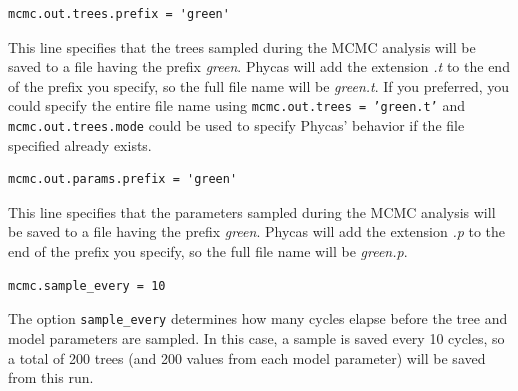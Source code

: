 \documentclass[10pt]{article}
\newcommand{\pathname}[1]{{\em #1}}				%
\newcommand{\code}[1]{{\tt #1}}					%
\newcommand{\opt}[1]{{\tt \small #1}\index{#1}}	%
\begin{document}
\begin{samepage}
\begin{verbatim}
mcmc.out.trees.prefix = 'green'
\end{verbatim}
This line specifies that the trees sampled during the MCMC analysis will be saved to a file having the prefix \pathname{green}. Phycas will add the extension \pathname{.t} to the end of the prefix you specify, so the full file name will be \pathname{green.t}. If you preferred, you could specify the entire file name using \code{mcmc.out.trees = 'green.t'} and \code{mcmc.out.trees.mode} could be used to specify Phycas' behavior if the file specified already exists.
\end{samepage}

\begin{samepage}
\begin{verbatim}
mcmc.out.params.prefix = 'green'
\end{verbatim}
This line specifies that the parameters sampled during the MCMC analysis will be saved to a file having the prefix \pathname{green}. Phycas will add the extension \pathname{.p} to the end of the prefix you specify, so the full file name will be \pathname{green.p}. 
\end{samepage}


\begin{samepage}
\begin{verbatim}
mcmc.sample_every = 10
\end{verbatim}
The option \opt{sample\_every} determines how many cycles elapse before the tree and model parameters are sampled. In this case, a sample is saved every 10 cycles, so a total of 200 trees (and 200 values from each model parameter) will be saved from this run.
\end{samepage}
\end{document}

